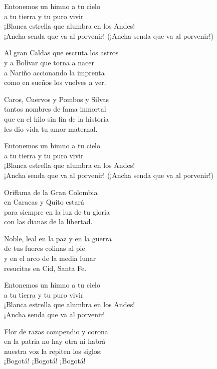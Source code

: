 \begin{lyrics}
Entonemos un himno a tu cielo\\
a tu tierra y tu puro vivir\\
¡Blanca estrella que alumbra en los Andes!\\
¡Ancha senda que va al porvenir!
(¡Ancha senda que va al porvenir!)

Al gran Caldas que escruta los astros\\
y a Bolívar que torna a nacer\\
a Nariño accionando la imprenta\\
como en sueños los vuelves a ver.

Caros, Cuervos y Pombos y Silvas\\
tantos nombres de fama inmortal\\
que en el hilo sin fin de la historia\\
les dio vida tu amor maternal.

Entonemos un himno a tu cielo\\
a tu tierra y tu puro vivir\\
¡Blanca estrella que alumbra en los Andes!\\
¡Ancha senda que va al porvenir!
(¡Ancha senda que va al porvenir!)

Oriflama de la Gran Colombia\\
en Caracas y Quito estará\\
para siempre en la luz de tu gloria\\
con las dianas de la libertad.

Noble, leal en la paz y en la guerra\\
de tus fueres colinas al pie\\
y en el arco de la media lunar\\
resucitas en Cid, Santa Fe.

Entonemos un himno a tu cielo\\
a tu tierra y tu puro vivir\\
¡Blanca estrella que alumbra en los Andes!\\
¡Ancha senda que va al porvenir!

Flor de razas compendio y corona\\
en la patria no hay otra ni habrá\\
nuestra voz la repiten los siglos:\\
¡Bogotá! ¡Bogotá! ¡Bogotá!
\end{lyrics}

